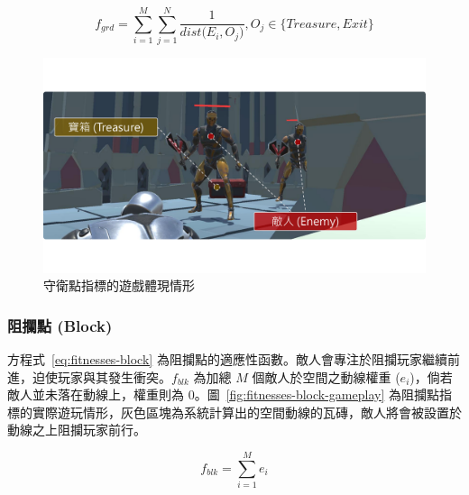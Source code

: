 \begin{equation}
    \label{eq:fitnesses-guard}
    f_{grd} = \sum_{i=1}^{M} \sum_{j=1}^{N} \frac{1}{dist\big(E_{i}, O_{j}\big)}, O_{j} \in \{ Treasure, Exit \}
\end{equation}

\begin{figure}[ht]
  \begin{center}
    \includegraphics[width=1.0\textwidth]{figures/fitnesses-guard-gameplay.pdf}
    \caption{守衛點指標的遊戲體現情形}
    \label{fig:fitnesses-guard-gameplay}
  \end{center}
\end{figure}

\subsubsection{阻攔點 (Block)}
\label{sssec:method-segments-fitnesses-block}

方程式~\ref{eq:fitnesses-block} 為阻攔點的適應性函數。敵人會專注於阻攔玩家繼續前進，迫使玩家與其發生衝突。$f_{blk}$ 為加總 $M$ 個敵人於空間之動線權重 ($e_{i}$)，倘若敵人並未落在動線上，權重則為 $0$。圖~\ref{fig:fitnesses-block-gameplay} 為阻攔點指標的實際遊玩情形，灰色區塊為系統計算出的空間動線的瓦磚，敵人將會被設置於動線之上阻攔玩家前行。

\begin{equation}
    \label{eq:fitnesses-block}
    f_{blk} = \sum_{i=1}^{M} e_{i}
\end{equation}

